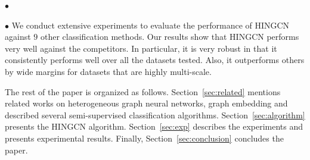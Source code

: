 \noindent$\bullet$

\noindent$\bullet$
We conduct extensive experiments %
to evaluate the performance of HINGCN
against $9$ other classification methods. 
Our results show that HINGCN performs very well against the competitors. 
In particular, it is very robust in that it consistently performs well over all the datasets tested. 
Also, it outperforms others by wide margins for datasets that are highly multi-scale. 

The rest of the paper is organized as follows.
Section~\ref{sec:related} mentions related works on heterogeneous graph neural networks, graph embedding and described several semi-supervised classification algorithms.
Section~\ref{sec:algorithm} presents the HINGCN algorithm.
Section~\ref{sec:exp} describes the experiments and presents experimental results.
Finally, Section~\ref{sec:conclusion} concludes the paper.



%
%

